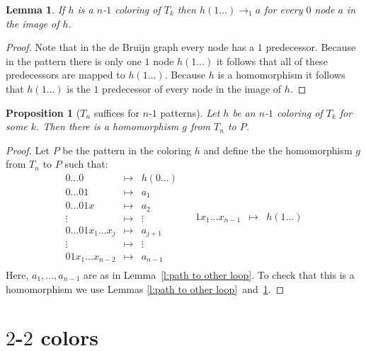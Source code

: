 \documentclass[a4paper]{article}
\newtheorem{lemma}[theorem]{Lemma}
\newtheorem{proposition}[theorem]{Proposition}
\begin{document}
\begin{lemma} \label{l:loop sees all}
 If $h$ is a $n$-$1$ coloring of $T_k$ then $h(1\dots) \rightarrow_1 a$
for every $0$ node $a$ in the image of $h$.
\end{lemma}
\begin{proof}
 Note that in the de Bruijn graph every node has a $1$ predecessor.
Because in the pattern there is only one $1$ node $h(1\dots)$ it follows
that all of these predecessors are mapped to $h(1\dots)$. Because $h$ is
a homomorphism it follows that $h(1\dots)$ is the $1$ predecessor of
every node in the image of $h$.
\end{proof}

\begin{proposition}[$T_n$ suffices for $n$-$1$ patterns]
 Let $h$ be an $n$-$1$ coloring of $T_k$ for some $k$. Then
there is a homomorphism $g$ from $T_n$ to $P$.
\end{proposition}
\begin{proof}
Let $P$ be the pattern in the coloring $h$ and define the the
homomorphism $g$ from $T_n$ to $P$ such that:
\[
 \begin{array}{rcl}
 0\dots0 & \mapsto & h(0\dots) \\
 0\dots01 & \mapsto & a_1 \\
 0\dots01x & \mapsto & a_2 \\
 \vdots & \mapsto & \vdots \\
 0\dots01x_1\dots x_j & \mapsto & a_{j + 1} \\
 \vdots & \mapsto & \vdots \\
 01x_1\dots x_{n - 2} & \mapsto & a_{n - 1} \\
 \end{array} \quad
 \begin{array}{rcl}
 1x_1\dots x_{n - 1} & \mapsto & h(1\dots) \\
 \end{array}
\]
Here, $a_1,\dots,a_{n - 1}$ are as in Lemma~\ref{l:path to other loop}.
To check that this is a homomorphism we use Lemmas \ref{l:path to
other loop}~and~\ref{l:loop sees all}.
\end{proof}

\section{$2$-$2$ colors}
\end{document}

